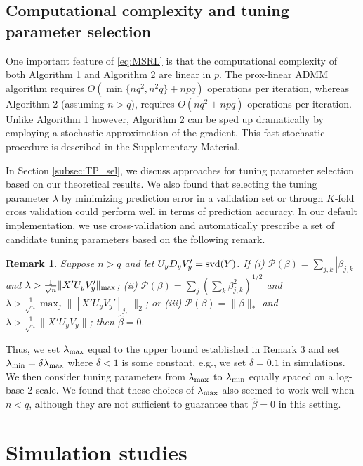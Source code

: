 \documentclass[12pt]{article}
\newtheorem{remark}{Remark}
\begin{document}
\subsection{Computational complexity and tuning parameter selection}
One important feature of \eqref{eq:MSRL} is that the computational complexity of both Algorithm 1 and Algorithm 2 are linear in $p$. The prox-linear ADMM algorithm requires $O(\min\{ nq^2, n^2q\} + npq)$ operations per iteration, whereas Algorithm 2 (assuming $n > q$), requires $O(nq^2 + npq)$ operations per iteration. Unlike Algorithm 1 however, Algorithm 2 can be sped up dramatically by employing a stochastic approximation of the gradient. This fast stochastic procedure is described in the Supplementary Material. 

In Section \ref{subsec:TP_sel}, we discuss approaches for tuning parameter selection based on our theoretical results. We also found that selecting the tuning parameter $\lambda$ by minimizing prediction error in a validation set or through $K$-fold cross validation could perform well in terms of prediction accuracy. In our default implementation, we use cross-validation and automatically prescribe a set of candidate tuning parameters based on the following remark. 

\begin{remark} Suppose $n > q$ and let $U_y D_y V_y' = {\rm svd}(Y)$. If \textit{(i)} $\mathcal{P}(\beta) = \sum_{j,k}|\beta_{j,k}|$ and $\lambda > \frac{1}{\sqrt{n}}\|X'U_y V_y'\|_{\rm max}$; \textit{(ii)} $\mathcal{P}(\beta) = \sum_{j}(\sum_k \beta^2_{j,k})^{1/2}$ and $\lambda > \frac{1}{\sqrt{n}}\max_{j}\|[X'U_yV_y']_{j,\cdot}\|_2$; or \textit{(iii)} $\mathcal{P}(\beta) = \|\beta\|_*$ and $\lambda > \frac{1}{\sqrt{n}}\|X'U_y V_y\|$;
then $\hat{\beta} = 0.$ 
\end{remark}
Thus, we set $\lambda_{\rm max}$ equal to the upper bound established in Remark 3 and set $\lambda_{\rm min} = \delta \lambda_{\rm max}$ where $\delta < 1$ is some constant, e.g., we set $\delta = 0.1$ in simulations. We then consider tuning parameters from  $\lambda_{\rm max}$ to $\lambda_{\rm min}$ equally spaced on a log-base-2 scale. We found that these choices of $\lambda_{\rm max}$ also seemed to work well when $n < q$, although they are not sufficient to guarantee that $\hat{\beta} = 0$ in this setting.


\section{Simulation studies}\label{sec:sim_studies}
\end{document}
